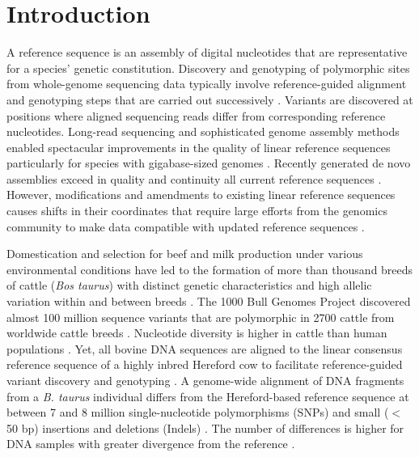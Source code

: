 \documentclass[../main.tex]{subfiles}
\begin{document}
\newpage

\section{Introduction}

\linespread{1.25} 
\normalsize

A reference sequence is an assembly of digital nucleotides that are representative for a species’ genetic constitution. 
Discovery and genotyping of polymorphic sites from whole-genome sequencing data typically involve reference-guided alignment and genotyping steps that are carried out successively \citep{depristo2011framework}. 
Variants are discovered at positions where aligned sequencing reads differ from corresponding reference nucleotides. Long-read sequencing and sophisticated genome assembly methods enabled spectacular improvements in the quality of linear reference sequences particularly for species with gigabase-sized genomes \citep{koren2018novo}. Recently generated de novo assemblies exceed in quality and continuity all current reference sequences \citep{miga2020telomere,rice2020continuous}. However, modifications and amendments to existing linear reference sequences causes shifts in their coordinates that require large efforts from the genomics community to make data compatible with updated reference sequences \citep{ballouz2019time}.

Domestication and selection for beef and milk production under various environmental conditions have led to the formation of more than thousand breeds of cattle (\emph{Bos taurus}) with distinct genetic characteristics and high allelic variation within and between breeds \citep{scherf2015second}. The 1000 Bull Genomes Project discovered almost 100 million sequence variants that are polymorphic in 2700 cattle from worldwide cattle breeds \citep{daetwyler2014whole,hayes20191000}. Nucleotide diversity is higher in cattle than human populations \citep{daetwyler2014whole,charlier2016ngs}. Yet, all bovine DNA sequences are aligned to the linear consensus reference sequence of a highly inbred Hereford cow to facilitate reference-guided variant discovery and genotyping \citep{worley2012sequencing,elsik2009genome}. A genome-wide alignment of DNA fragments from a \emph{B. taurus} individual differs from the Hereford-based reference sequence at between 7 and 8 million single-nucleotide polymorphisms (SNPs) and small ($<$ 50 bp) insertions and deletions (Indels) \citep{crysnanto2019accurate,jansen2013assessment}. The number of differences is higher for DNA samples with greater divergence from the reference \citep{kim2017genome,koufariotis2018sequencing}.
\end{document}
